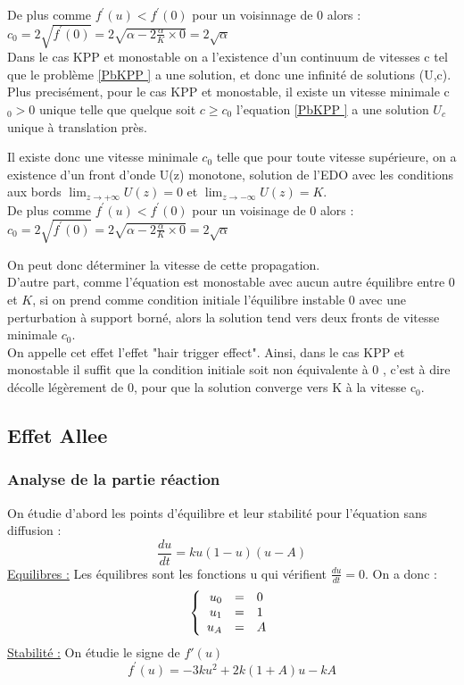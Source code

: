 \documentclass[a4paper,11pt]{article}
\begin{document}
    De plus comme $ f^\prime(u)< f^\prime(0)$ pour un voisinnage de $0$ alors : \\
    $c_0=2 \sqrt{f^\prime(0)}= 2 \sqrt{\alpha - 2 \frac{\alpha}{K} \times 0} = 2 \sqrt{\alpha}$\\

Dans le cas KPP et monostable on a l'existence d'un continuum de vitesses c tel que le problème \ref{PbKPP } a une solution, et donc une infinité de solutions (U,c). Plus precisément, pour le cas KPP et monostable, il existe un vitesse minimale c$_0 >0$ unique telle que quelque soit $c  \geqslant c_0$ l'equation \ref{PbKPP } a une solution $U_c$ unique à translation près.

    Il existe donc une vitesse minimale $c_0$ telle que pour toute vitesse supérieure, on a existence d'un front d'onde U(z) monotone, solution de l'EDO avec les conditions aux bords $\lim_{z \to +\infty} U(z)=0$ et $\lim_{z \to -\infty} U(z)=K$. \\
    
    De plus comme $ f^\prime(u)< f^\prime(0)$ pour un voisinage de $0$ alors : \\
    $c_0=2 \sqrt{f^\prime(0)}= 2 \sqrt{\alpha - 2 \frac{\alpha}{K} \times 0} = 2 \sqrt{\alpha}$

    On peut donc déterminer la vitesse de cette propagation. \\
    
    
        D'autre part, comme l'équation est monostable avec aucun autre équilibre entre $0$ et $K$, si on prend comme condition initiale l'équilibre instable $0$ avec une perturbation à support borné, alors la solution tend vers deux fronts de vitesse minimale $c_0$. \\
		On appelle cet effet l'effet "hair trigger effect". Ainsi, dans le cas KPP et monostable il suffit que
		la condition initiale soit non équivalente à 0 , c'est à dire décolle légèrement de 0, pour que la solution
		converge vers K à la vitesse c$_0$. 
		
		
		
\subsection{Effet Allee}
\subsubsection{Analyse de la partie réaction}
On étudie d'abord les points d'équilibre et leur stabilité pour l'équation sans diffusion : $$\frac{du}{dt}=ku(1-u)(u-A)$$
\underline{Equilibres :} Les équilibres sont les fonctions u qui vérifient $\frac{du}{dt}=0$. On a donc :
\[
\left\{
\begin{array}{r c l}
u_0 &=& 0\\
u_1 &=& 1\\
u_A &=& A\\
\end{array}
\right.
\]
\underline{Stabilité :} On étudie le signe de $f'(u)$ 
$$f^\prime(u)= -3ku^2 + 2k(1+A)u-kA$$
\end{document}
